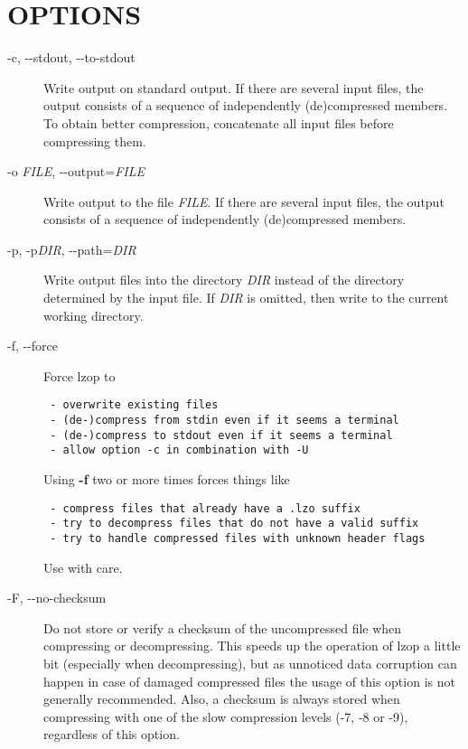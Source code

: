 \section{OPTIONS\label{OPTIONS}}
\begin{description}

\item[{-c, -{}-stdout, -{}-to-stdout}] \mbox{}

Write output on standard output. If there are several
input files, the output consists of a sequence
of independently (de)compressed members. To obtain
better compression, concatenate all input files
before compressing them.


\item[{-o \textit{FILE}, -{}-output=\textit{FILE}}] \mbox{}

Write output to the file \textit{FILE}. If there are several
input files, the output consists of a sequence
of independently (de)compressed members.


\item[{-p, -p\textit{DIR}, -{}-path=\textit{DIR}}] \mbox{}

Write output files into the directory \textit{DIR} instead
of the directory determined by the input file. If
\textit{DIR} is omitted, then write to the current working
directory.


\item[{-f, -{}-force}] \mbox{}

Force lzop to

\begin{verbatim}
 - overwrite existing files
 - (de-)compress from stdin even if it seems a terminal
 - (de-)compress to stdout even if it seems a terminal
 - allow option -c in combination with -U
\end{verbatim}


Using \textbf{-f} two or more times forces things like

\begin{verbatim}
 - compress files that already have a .lzo suffix
 - try to decompress files that do not have a valid suffix
 - try to handle compressed files with unknown header flags
\end{verbatim}


Use with care.


\item[{-F, -{}-no-checksum}] \mbox{}

Do not store or verify a checksum of the uncompressed
file when compressing or decompressing.
This speeds up the operation of lzop a little bit (especially
when decompressing), but as unnoticed data corruption can happen
in case of damaged compressed files the usage of this option
is not generally recommended.
Also, a checksum is always stored when
compressing with one of the slow compression levels (-7, -8 or -9),
regardless of this option.



\end{description}
